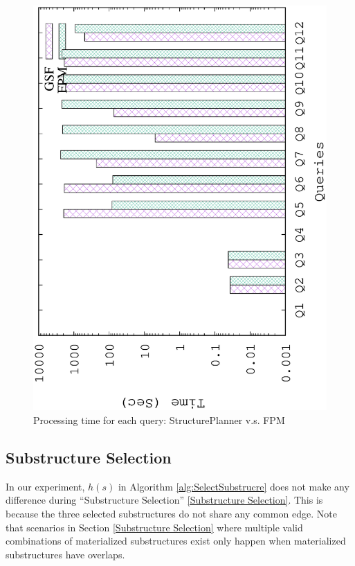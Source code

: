 \begin{figure}[H]
	\centering
	\includegraphics[scale=0.5, angle=270]{plot/qfpm}
	\caption{Processing time for each query: StructurePlanner v.s. FPM}
	\label{fig:qfpm}
\end{figure}


\subsection{Substructure Selection}
\label{exp:Substructure Selection}

In our experiment, $h(s)$ in Algorithm \ref{alg:SelectSubstrucre} does not make any difference during ``Substructure Selection'' \ref{Substructure Selection}. This is because the three selected substructures do not share any common edge. Note that scenarios in Section \ref{Substructure Selection} where multiple valid combinations of materialized substructures exist only happen when materialized substructures have overlaps. 

